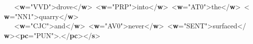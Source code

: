 \begin{shaded}
   {<\textbf{w}\hspace*{1em}{pos}="{VVD}">}drove{</\textbf{w}>} {<\textbf{w}\hspace*{1em}{pos}="{PRP}">}into{</\textbf{w}>} {<\textbf{w}\hspace*{1em}{pos}="{AT0}">}the{</\textbf{w}>} {<\textbf{w}\hspace*{1em}{pos}="{NN1}">}quarry{</\textbf{w}>} \newline
   {<\textbf{w}\hspace*{1em}{pos}="{CJC}">}and{</\textbf{w}>} {<\textbf{w}\hspace*{1em}{pos}="{AV0}">}never{</\textbf{w}>} {<\textbf{w}\hspace*{1em}{pos}="{SENT}">}surfaced{</\textbf{w}>}{<\textbf{pc}\hspace*{1em}{pos}="{PUN}">}.{</\textbf{pc}>}{</\textbf{s}>}\newline
\end{shaded}\egroup\par \par
